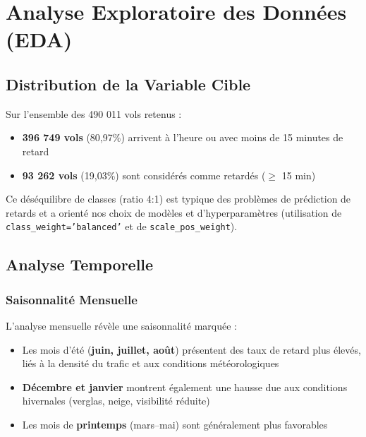 \documentclass[12pt,a4paper]{article}
\begin{document}
\newpage
\section{Analyse Exploratoire des Données (EDA)}

\subsection{Distribution de la Variable Cible}

Sur l'ensemble des 490 011 vols retenus :
\begin{itemize}[leftmargin=*]
  \item \textbf{396 749 vols} (80,97\%) arrivent à l'heure ou avec moins de 15 minutes de retard
  \item \textbf{93 262 vols} (19,03\%) sont considérés comme retardés ($\geq$ 15 min)
\end{itemize}

Ce déséquilibre de classes (ratio 4:1) est typique des problèmes de prédiction de 
retards et a orienté nos choix de modèles et d'hyperparamètres (utilisation de 
\texttt{class\_weight='balanced'} et de \texttt{scale\_pos\_weight}).

\subsection{Analyse Temporelle}

\subsubsection{Saisonnalité Mensuelle}

L'analyse mensuelle révèle une saisonnalité marquée :
\begin{itemize}[leftmargin=*]
  \item Les mois d'été (\textbf{juin, juillet, août}) présentent des taux de retard 
        plus élevés, liés à la densité du trafic et aux conditions météorologiques
  \item \textbf{Décembre et janvier} montrent également une hausse due aux conditions 
        hivernales (verglas, neige, visibilité réduite)
  \item Les mois de \textbf{printemps} (mars--mai) sont généralement plus favorables
\end{itemize}
\end{document}
